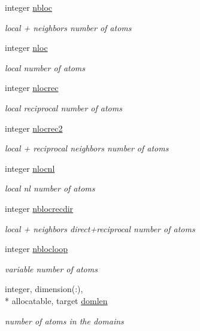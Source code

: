 \begin{DoxyCompactItemize}
integer \hyperlink{classdomdec_aa10da3a10adb24dfdbcb8ce13d4d3883}{nbloc}
\begin{DoxyCompactList}\small\item\em local + neighbors number of atoms \end{DoxyCompactList}\item 
integer \hyperlink{classdomdec_a9ce080b6f61843bfcf7f9a11a90a7ba5}{nloc}
\begin{DoxyCompactList}\small\item\em local number of atoms \end{DoxyCompactList}\item 
integer \hyperlink{classdomdec_a15d118ab39f277c8787003cda8a222d2}{nlocrec}
\begin{DoxyCompactList}\small\item\em local reciprocal number of atoms \end{DoxyCompactList}\item 
integer \hyperlink{classdomdec_a611d883dfaae5395b468ac03b000e572}{nlocrec2}
\begin{DoxyCompactList}\small\item\em local + reciprocal neighbors number of atoms \end{DoxyCompactList}\item 
integer \hyperlink{classdomdec_a7b54734f2525070176f359438cc508fa}{nlocnl}
\begin{DoxyCompactList}\small\item\em local nl number of atoms \end{DoxyCompactList}\item 
integer \hyperlink{classdomdec_aba62c8c31213bb0025d171e5e2adb210}{nblocrecdir}
\begin{DoxyCompactList}\small\item\em local + neighbors direct+reciprocal number of atoms \end{DoxyCompactList}\item 
integer \hyperlink{classdomdec_a597fdf38e68a3e3e120320f814fcc12e}{nblocloop}
\begin{DoxyCompactList}\small\item\em variable number of atoms \end{DoxyCompactList}\item 
integer, dimension(\-:), \\*
allocatable, target \hyperlink{classdomdec_a558b181b6a0bbd65a74c4525ff5de2de}{domlen}
\begin{DoxyCompactList}\small\item\em number of atoms in the domains \end{DoxyCompactList}\item 

\end{DoxyCompactItemize}
